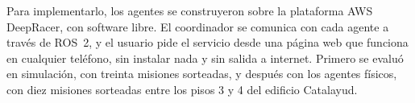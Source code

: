 Para implementarlo, los agentes se construyeron sobre la plataforma AWS DeepRacer, con software libre. El
coordinador se comunica con cada agente a través de ROS~2, y el usuario pide el
servicio desde una página web que funciona en cualquier teléfono, sin instalar nada y
sin salida a internet. Primero se evaluó en simulación, con treinta misiones sorteadas, y después con los agentes físicos, con diez misiones sorteadas
entre los pisos 3 y 4 del edificio Catalayud.
